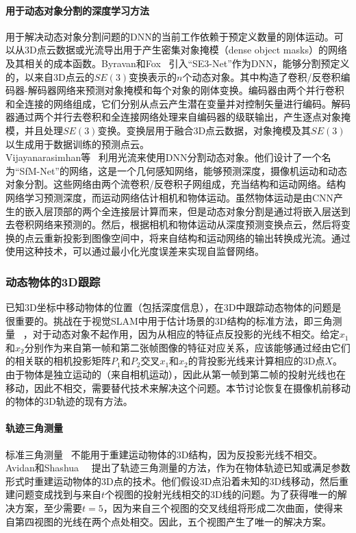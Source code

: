 \paragraph{用于动态对象分割的深度学习方法}
用于解决动态对象分割问题的DNN的当前工作依赖于预定义数量的刚体运动。可以从3D点云数据或光流导出用于产生密集对象掩模（dense object masks）的网络及其相关的成本函数。Byravan和Fox~\cite{byravan2017se3}
引入“SE3-Net”作为DNN，能够分割预定义的，以来自3D点云的$SE(3)$变换表示的$n$个动态对象。其中构造了卷积/反卷积编码器-解码器网络来预测对象掩模和每个对象的刚体变换。编码器由两个并行卷积和全连接的网络组成，它们分别从点云产生潜在变量并对控制矢量进行编码。解码器通过两个并行去卷积和全连接网络处理来自编码器的级联输出，产生逐点对象掩模，并且处理$SE(3)$变换。变换层用于融合3D点云数据，对象掩模及其$SE(3)$以生成用于数据训练的预测点云。\\

Vijayanarasimhan等~\cite{vijayanarasimhan2017sfm}
利用光流来使用DNN分割动态对象。他们设计了一个名为“SfM-Net”的网络，这是一个几何感知网络，能够预测深度，摄像机运动和动态对象分割。这些网络由两个流卷积/反卷积子网组成，充当结构和运动网络。结构网络学习预测深度，而运动网络估计相机和物体运动。虽然物体运动是由CNN产生的嵌入层顶部的两个全连接层计算而来，但是动态对象分割是通过将嵌入层送到去卷积网络来预测的。然后，根据相机和物体运动从深度预测变换点云，然后将变换的点云重新投影到图像空间中，将来自结构和运动网络的输出转换成光流。通过使用这种技术，可以通过最小化光度误差来实现自监督网络。\\



\subsubsection{动态物体的3D跟踪}
已知3D坐标中移动物体的位置（包括深度信息），在3D中跟踪动态物体的问题是很重要的。挑战在于视觉SLAM中用于估计场景的3D结构的标准方法，即三角测量~\cite{hartley1997triangulation}
，对于动态对象不起作用，因为从相应的特征点反投影的光线不相交。给定$x_1$和$x_2$分别作为来自第一帧和第二张帧图像的特征对应关系，应该能够通过经由它们的相关联的相机投影矩阵$P_1$和$P_2$交叉$x_1$和$x_2$的背投影光线来计算相应的3D点$X$。由于物体是独立运动的（来自相机运动），因此从第一帧到第二帧的投射光线也在移动，因此不相交，需要替代技术来解决这个问题。本节讨论恢复在摄像机前移动的物体的3D轨迹的现有方法。

\paragraph{轨迹三角测量}
标准三角测量~\cite{hartley1997triangulation}
不能用于重建运动物体的3D结构，因为反投影光线不相交。Avidan和Shashua~\cite{avidan1999trajectory}~\cite{avidan2000trajectory}
提出了轨迹三角测量的方法，作为在物体轨迹已知或满足参数形式时重建运动物体的3D点的技术。他们假设3D点沿着未知的3D线移动，然后重建问题变成找到与来自$t$个视图的投射光线相交的3D线的问题。为了获得唯一的解决方案，至少需要$t=5$，因为来自三个视图的交叉线组将形成二次曲面，使得来自第四视图的光线在两个点处相交。因此，五个视图产生了唯一的解决方案。\\

